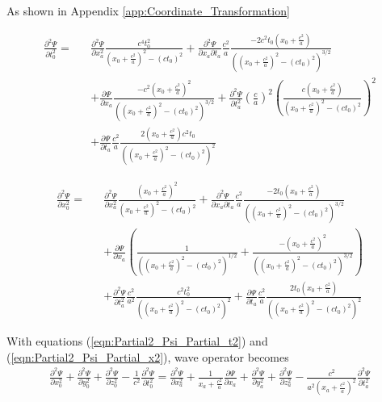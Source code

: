\documentclass[prd,showpacs,preprint]{revtex4-1}
\begin{document}
As shown in Appendix {\ref{app:Coordinate_Transformation}}

\begin{eqnarray}
\frac{\partial^2 \Psi}{\partial t_0^2}=&&\frac{\partial^2 \Psi}{\partial x_a^2}\frac{c^4t_0^2}{(x_0+\frac{c^2}{a})^2 - (ct_0)^2} + \frac{\partial^2 \Psi}{\partial x_a\partial t_a}\frac{c^2}{a}\frac{-2c^2t_0(x_0+\frac{c^2}{a})}{((x_0+\frac{c^2}{a})^2-(ct_0)^2)^{3/2}}\nonumber\\
&& + \frac{\partial \Psi}{\partial x_a}\frac{-c^2(x_0+\frac{c^2}{a})^2}{((x_0+\frac{c^2}{a})^2-(ct_0)^2)^{3/2}} + \frac{\partial^2 \Psi}{\partial t_a^2}(\frac{c}{a})^2(\frac{c(x_0+\frac{c^2}{a})}{(x_0+\frac{c^2}{a})^2-(ct_0)^2})^2\nonumber\\
&& + \frac{\partial \Psi}{\partial t_a}\frac{c^2}{a}\frac{2(x_0+\frac{c^2}{a})c^2t_0}{((x_0+\frac{c^2}{a})^2-(ct_0)^2)^2}
\label{eqn:Partial2_Psi_Partial_t2}
\end{eqnarray}

\begin{eqnarray}
\frac{\partial^2 \Psi}{\partial x_0^2} =&& \frac{\partial^2 \Psi}{\partial x_a^2}\frac{(x_0+\frac{c^2}{a})^2}{(x_0+\frac{c^2}{a})^2-(ct_0)^2} + \frac{\partial^2 \Psi}{\partial x_a\partial t_a}\frac{c^2}{a}\frac{-2t_0(x_0+\frac{c^2}{a})}{((x_0+\frac{c^2}{a})^2-(ct_0)^2)^{3/2}}\nonumber\\
&& + \frac{\partial \Psi}{\partial x_a}(\frac{1}{((x_0+\frac{c^2}{a})^2-(ct_0)^2)^{1/2}} + \frac{-(x_0+\frac{c^2}{a})^2}{((x_0+\frac{c^2}{a})^2-(ct_0)^2)^{3/2}})\nonumber\\
&& + \frac{\partial^2 \Psi}{\partial t_a^2}\frac{c^2}{a^2}\frac{c^2t_0^2}{((x_0+\frac{c^2}{a})^2-(ct_0)^2)^2} + \frac{\partial \Psi}{\partial t_a}\frac{c^2}{a}\frac{2t_0(x_0+\frac{c^2}{a})}{((x_0+\frac{c^2}{a})^2-(ct_0)^2)^2}
\label{eqn:Partial2_Psi_Partial_x2}
\end{eqnarray}

With equations (\ref{eqn:Partial2_Psi_Partial_t2}) and (\ref{eqn:Partial2_Psi_Partial_x2}), wave operator becomes
\begin{eqnarray}
\frac{\partial^2 \Psi}{\partial x_0^2}+\frac{\partial^2 \Psi}{\partial y_0^2} + \frac{\partial^2 \Psi}{\partial z_0^2} - \frac{1}{c^2}\frac{\partial^2 \Psi}{\partial t_0^2} = \frac{\partial^2 \Psi}{\partial x_a^2} + \frac{1}{x_a+\frac{c^2}{a}}\frac{\partial \Psi}{\partial x_a} + \frac{\partial^2 \Psi}{\partial y_a^2} + \frac{\partial^2 \Psi}{\partial z_a^2} - \frac{c^2}{a^2(x_a+\frac{c^2}{a})^2}\frac{\partial^2 \Psi}{\partial t_a^2}
\label{eqn:Sint}
\end{eqnarray}
\end{document}
